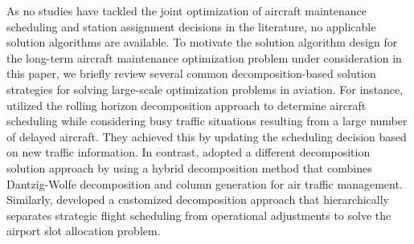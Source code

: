 As no studies have tackled the joint optimization of aircraft maintenance scheduling and station assignment decisions in the literature, no applicable solution algorithms are available. To motivate the solution algorithm design for the long-term aircraft maintenance optimization problem under consideration in this paper, we briefly review several common decomposition-based solution strategies for solving large-scale optimization problems in aviation. 
For instance, \cite{sama2013rolling} utilized the rolling horizon decomposition approach to determine aircraft scheduling while considering busy traffic situations resulting from a large number of delayed aircraft. They achieved this by updating the scheduling decision based on new traffic information. 
In contrast, \cite{diao2018sequence} adopted a different decomposition solution approach by using a hybrid decomposition method that combines Dantzig-Wolfe decomposition and column generation for air traffic management. Similarly, \cite{wang2025airport} developed a customized decomposition approach that hierarchically separates strategic flight scheduling from operational adjustments to solve the airport slot allocation problem. 



\color{black}
